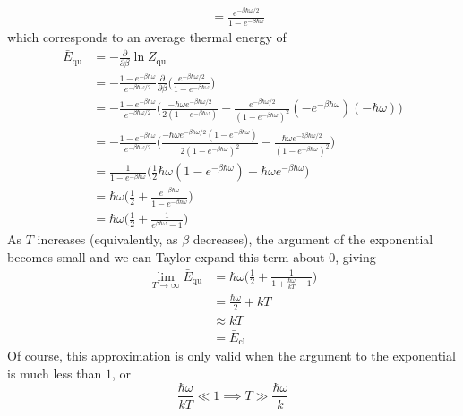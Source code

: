 \documentclass[../principles-of-quantum-mechanics.tex]{subfiles}
\begin{document}
\begin{questions}
\begin{solution}
\begin{align*}
				&= \frac{e^{-\beta\hbar\omega/2}}{1 - e^{-\beta\hbar\omega}}
			\end{align*}
			which corresponds to an average thermal energy of
			\begin{align*}
				\bar{E}_{\text{qu}} &= {-\frac{\partial}{\partial \beta}}\ln Z_{\text{qu}} \\
					&= {-\frac{1 - e^{-\beta\hbar\omega}}{e^{-\beta\hbar\omega/2}}\frac{\partial}{\partial\beta}}\Big(\frac{e^{-\beta\hbar\omega/2}}{1 - e^{-\beta\hbar\omega}}\Big) \\
					&= -\frac{1 - e^{-\beta\hbar\omega}}{e^{-\beta\hbar\omega/2}}\Big(\frac{-\hbar\omega e^{-\beta\hbar\omega/2}}{2(1 - e^{-\beta\hbar\omega})} - \frac{e^{-\beta\hbar\omega/2}}{(1 - e^{-\beta\hbar\omega})^2}(-e^{-\beta\hbar\omega})(-\hbar\omega)\Big) \\
					&= -\frac{1 - e^{-\beta\hbar\omega}}{e^{-\beta\hbar\omega/2}}\Big(\frac{-\hbar\omega e^{-\beta\hbar\omega/2}(1 - e^{-\beta\hbar\omega})}{2(1 - e^{-\beta\hbar\omega})^2} - \frac{\hbar\omega e^{-3\beta\hbar\omega/2}}{(1 - e^{-\beta\hbar\omega})^2}\Big) \\
					&= \frac{1}{1 - e^{-\beta\hbar\omega}}\Big(\frac{1}{2}\hbar\omega (1 - e^{-\beta\hbar\omega}) + \hbar\omega e^{-\beta\hbar\omega}\Big) \\
					&= \hbar\omega\Big(\frac{1}{2} + \frac{e^{-\beta\hbar\omega}}{1 - e^{-\beta\hbar\omega}}\Big) \\
					&= \hbar\omega\Big(\frac{1}{2} + \frac{1}{e^{\beta\hbar\omega} - 1}\Big)
			\end{align*}
			As $T$ increases (equivalently, as $\beta$ decreases), the argument of the exponential becomes small and we can Taylor expand this term about $0$, giving
			\begin{align*}
				\lim_{T\to\infty}\bar{E}_{\text{qu}} &= \hbar\omega\Big(\frac{1}{2} + \frac{1}{1 + \frac{\hbar\omega}{kT} - 1}\Big) \\
				&= \frac{\hbar\omega}{2} + kT \\
				&\approx kT \\
				&= \bar{E}_{\text{cl}}
			\end{align*}
			Of course, this approximation is only valid when the argument to the exponential is much less than $1$, or
			$$\frac{\hbar\omega}{kT} \ll 1 \implies T \gg \frac{\hbar\omega}{k}$$
			

\end{solution}
\end{questions}
\end{document}
